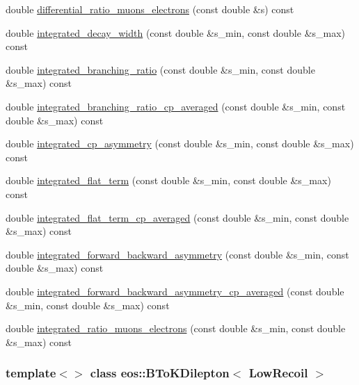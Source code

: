 \begin{DoxyCompactItemize}
\item 
double \hyperlink{classeos_1_1BToKDilepton_3_01LowRecoil_01_4_aecc334af199b1b9c16db9018e4a61b85}{differential\_\-ratio\_\-muons\_\-electrons} (const double \&s) const 
\item 
double \hyperlink{classeos_1_1BToKDilepton_3_01LowRecoil_01_4_a36eb5eb65be6edd0573f54e7295cf4da}{integrated\_\-decay\_\-width} (const double \&s\_\-min, const double \&s\_\-max) const 
\item 
double \hyperlink{classeos_1_1BToKDilepton_3_01LowRecoil_01_4_a330a3d90e0165b7e18fce47207ad288e}{integrated\_\-branching\_\-ratio} (const double \&s\_\-min, const double \&s\_\-max) const 
\item 
double \hyperlink{classeos_1_1BToKDilepton_3_01LowRecoil_01_4_a13204b4a9edf339d616343b3b739fd5e}{integrated\_\-branching\_\-ratio\_\-cp\_\-averaged} (const double \&s\_\-min, const double \&s\_\-max) const 
\item 
double \hyperlink{classeos_1_1BToKDilepton_3_01LowRecoil_01_4_a5fb1faf6b03885cf721cfbca5614dd84}{integrated\_\-cp\_\-asymmetry} (const double \&s\_\-min, const double \&s\_\-max) const 
\item 
double \hyperlink{classeos_1_1BToKDilepton_3_01LowRecoil_01_4_aad855a5a327319887e700df9b190dfbb}{integrated\_\-flat\_\-term} (const double \&s\_\-min, const double \&s\_\-max) const 
\item 
double \hyperlink{classeos_1_1BToKDilepton_3_01LowRecoil_01_4_acd005442e53ce2c35041e57b3352666b}{integrated\_\-flat\_\-term\_\-cp\_\-averaged} (const double \&s\_\-min, const double \&s\_\-max) const 
\item 
double \hyperlink{classeos_1_1BToKDilepton_3_01LowRecoil_01_4_ab0a666af26f13450241d20665895f665}{integrated\_\-forward\_\-backward\_\-asymmetry} (const double \&s\_\-min, const double \&s\_\-max) const 
\item 
double \hyperlink{classeos_1_1BToKDilepton_3_01LowRecoil_01_4_a6e959efacf222941a894a5363228603b}{integrated\_\-forward\_\-backward\_\-asymmetry\_\-cp\_\-averaged} (const double \&s\_\-min, const double \&s\_\-max) const 
\item 
double \hyperlink{classeos_1_1BToKDilepton_3_01LowRecoil_01_4_aeeffa11fc2582619a076852898ff1787}{integrated\_\-ratio\_\-muons\_\-electrons} (const double \&s\_\-min, const double \&s\_\-max) const 
\end{DoxyCompactItemize}
\subsubsection*{template$<$$>$ class eos::BToKDilepton$<$ LowRecoil $>$}



